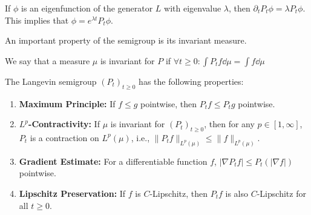 \begin{corollary} \label{prop:flow_of_eig}
    If $\phi$ is an eigenfunction of the generator $L$ with eigenvalue $\lambda$, then $\partial_t P_t \phi = \lambda P_t \phi$. This implies that $\phi = e^{\lambda t}P_t \phi$.
\end{corollary}

An important property of the semigroup is its invariant measure.

\begin{definition}
    We say that a measure $\mu$ is invariant for $P$ if $\forall t \ge 0 : \int P_t f \dd{\mu} = \int f \dd{\mu}$
\end{definition}

\begin{theorem} \label{thm:prop_of_semigroup}
The Langevin semigroup $(P_t)_{t\ge 0}$ has the following properties:
\begin{enumerate}
    \item \textbf{Maximum Principle:} If $f \le g$ pointwise, then $P_t f \le P_t g$ pointwise.
    \item \textbf{$L^p$-Contractivity:} If $\mu$ is invariant for $(P_t)_{t \ge 0}$, then for any $p \in [1, \infty]$, $P_t$ is a contraction on $L^p(\mu)$, i.e., $\|P_t f\|_{L^p(\mu)} \le \|f\|_{L^p(\mu)}$.
    \item \textbf{Gradient Estimate:} For a differentiable function $f$, $|\nabla P_t f| \le P_t(|\nabla f|)$ pointwise.
    \item \textbf{Lipschitz Preservation:} If $f$ is $C$-Lipschitz, then $P_t f$ is also $C$-Lipschitz for all $t \ge 0$.
\end{enumerate}
\end{theorem}
